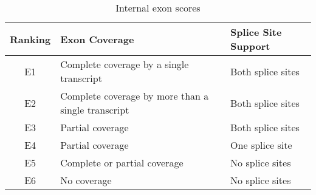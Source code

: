 
\begin{table}[h!]	
	\caption{Internal exon scores}
	\label{tab:internal}
	\centering
	\begin{tabular}{|c|l|l|}
		\hline
		Ranking & Exon Coverage & Splice Site Support\\
		\hline
		E1 & Complete coverage by a single transcript & Both splice sites\\
		E2 & Complete coverage by more than a single transcript & Both splice sites\\
		E3 & Partial coverage & Both splice sites\\
		E4 & Partial coverage & One splice site\\
		E5 & Complete or partial coverage & No splice sites\\
		E6 & No coverage & No splice sites\\
		\hline
	\end{tabular}

\end{table}
\lipsum[2]